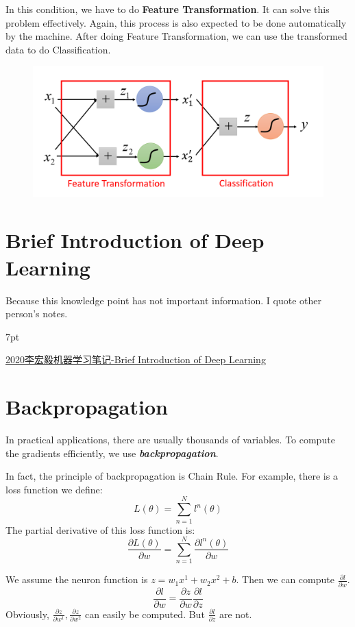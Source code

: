 \documentclass{article}
\newenvironment{quoteblock}{%
\def\FrameCommand{%
\hspace{1pt}%
{\color{DarkBlue}\vrule width 2pt}%
{\color{formalshade}\vrule width 4pt}%
\colorbox{formalshade}%
}%
\MakeFramed{\advance\hsize-\width\FrameRestore}%
\noindent\hspace{-4.55pt}%
\begin{adjustwidth}{}{7pt}%
\vspace{2pt}\vspace{2pt}%
}
{%
\vspace{2pt}\end{adjustwidth}\endMakeFramed%
}
\begin{document}
In this condition, we have to do \textbf{Feature Transformation}. It can solve this problem effectively. Again, this process is also expected to be done automatically by the machine. After doing Feature Transformation, we can use the transformed data to do Classification.

\begin{figure}[htbp]
  \centering
  \includegraphics[scale=0.5]{pic/Feature Transformation .png}
  \label{fig:my_label}
\end{figure}

\section{Brief Introduction of Deep Learning}

Because this knowledge point has not important information. I quote other person's notes.

\begin{quoteblock}
    \href{https://blog.csdn.net/zn961018/article/details/116084191}{2020李宏毅机器学习笔记-Brief Introduction of Deep Learning}
\end{quoteblock}

\section{Backpropagation}

In practical applications, there are usually thousands of variables. To compute the gradients efficiently, we use \textit{\textbf{backpropagation}}.

In fact, the principle of backpropagation is Chain Rule. For example, there is a loss function we define:
$$
L(\theta) = \sum_{n=1}^N l^n(\theta)
$$
The partial derivative of this loss function is:
$$
\frac{\partial L(\theta)}{\partial w} = \sum_{n=1}^N\frac{\partial l^n(\theta)}{\partial w}
$$

We assume the neuron function is $z = w_1x^1+w_2x^2+b$. Then we can compute $\frac{\partial l}{\partial w}$.
$$
\frac{\partial l}{\partial w}=\frac{\partial z}{\partial w}\frac{\partial l}{\partial z}
$$
Obviously, $\frac{\partial z}{\partial w^1},\frac{\partial z}{\partial w^2}$ can easily be computed. But $\frac{\partial l}{\partial z}$ are not.
\end{document}
